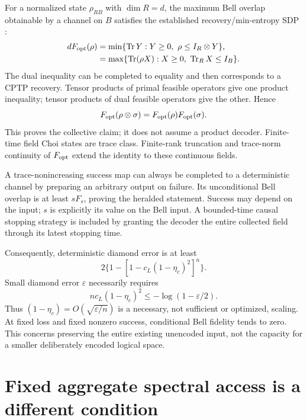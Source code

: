 \documentclass[11pt,a4paper]{article}
\begin{document}
For a normalized state $\rho_{RB}$ with $\dim R=d$, the maximum Bell overlap obtainable by a channel on $B$ satisfies the established recovery/min-entropy SDP \cite{koenig}:
\begin{align}
 dF_{\rm opt}(\rho)&=\min\{\operatorname{Tr} Y:Y\ge0,\ \rho\le I_R\otimes Y\},\\
 &=\max\{\operatorname{Tr}(\rho X):X\ge0,\ \operatorname{Tr}_R X\le I_B\}.
 \label{eq:sdp}
\end{align}
The dual inequality can be completed to equality and then corresponds to a CPTP recovery. Tensor products of primal feasible operators give one product inequality; tensor products of dual feasible operators give the other. Hence
\begin{equation}
 F_{\rm opt}(\rho\otimes\sigma)=F_{\rm opt}(\rho)F_{\rm opt}(\sigma).
\end{equation}
This proves the collective claim; it does not assume a product decoder. Finite-time field Choi states are trace class. Finite-rank truncation and trace-norm continuity of $F_{\rm opt}$ extend the identity to these continuous fields.

A trace-nonincreasing success map can always be completed to a deterministic channel by preparing an arbitrary output on failure. Its unconditional Bell overlap is at least $sF_s$, proving the heralded statement. Success may depend on the input; $s$ is explicitly its value on the Bell input. A bounded-time causal stopping strategy is included by granting the decoder the entire collected field through its latest stopping time.

Consequently, deterministic diamond error is at least
\begin{equation}
 2\{1-[1-c_L(1-\eta_c)^2]^n\}.
\end{equation}
Small diamond error $\varepsilon$ necessarily requires
\begin{equation}
 nc_L(1-\eta_c)^2\le-\log(1-\varepsilon/2).
\end{equation}
Thus $(1-\eta_c)=O(\sqrt{\varepsilon/n})$ is a necessary, not sufficient or optimized, scaling. At fixed loss and fixed nonzero success, conditional Bell fidelity tends to zero. This concerns preserving the entire existing unencoded input, not the capacity for a smaller deliberately encoded logical space.

\section{Fixed aggregate spectral access is a different condition}
\end{document}
